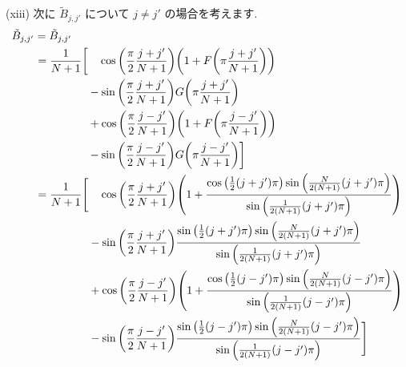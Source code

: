 \documentclass[a4paper,dvipdfmx]{jsarticle}
\theoremstyle{definition}
\begin{document}
(xiii) 次に $\tilde{B}_{j,j'}$ について $j \neq j'$ の場合を考えます.
\begin{align}
  \tilde{B}_{j,j'} & = \tilde{B}_{j,j'}                                                                                                                                                                         \\
                   & \ \begin{aligned}
                         = \frac{1}{N+1}\bigg[ & \quad\cos\qty(\frac{\pi}{2}\frac{j + j'}{N+1})\qty(1 + F\qty(\pi\frac{j + j'}{N+1})) \\
                                               & - \sin\qty(\frac{\pi}{2}\frac{j + j'}{N+1})G\qty(\pi\frac{j + j'}{N+1})              \\
                                               & + \cos\qty(\frac{\pi}{2}\frac{j - j'}{N+1})\qty(1 + F\qty(\pi\frac{j - j'}{N+1}))    \\
                                               & - \sin\qty(\frac{\pi}{2}\frac{j - j'}{N+1})G\qty(\pi\frac{j - j'}{N+1})\bigg]
                       \end{aligned}                                                                                               \\
                   & \ \begin{aligned}
                         = \frac{1}{N+1}\Bigg[ & \quad\cos\qty(\frac{\pi}{2}\frac{j + j'}{N+1})\qty(1 + \frac{\cos\qty(\frac{1}{2}(j+j')\pi)\sin\qty(\frac{N}{2(N+1)}(j+j')\pi)}{\sin\qty(\frac{1}{2(N+1)}(j+j')\pi)}) \\
                                               & - \sin\qty(\frac{\pi}{2}\frac{j + j'}{N+1})\frac{\sin\qty(\frac{1}{2}(j+j')\pi)\sin\qty(\frac{N}{2(N+1)}(j+j')\pi)}{\sin\qty(\frac{1}{2(N+1)}(j+j')\pi)}              \\
                                               & + \cos\qty(\frac{\pi}{2}\frac{j - j'}{N+1})\qty(1 + \frac{\cos\qty(\frac{1}{2}(j-j')\pi)\sin\qty(\frac{N}{2(N+1)}(j-j')\pi)}{\sin\qty(\frac{1}{2(N+1)}(j-j')\pi)})    \\
                                               & - \sin\qty(\frac{\pi}{2}\frac{j - j'}{N+1})\frac{\sin\qty(\frac{1}{2}(j-j')\pi)\sin\qty(\frac{N}{2(N+1)}(j-j')\pi)}{\sin\qty(\frac{1}{2(N+1)}(j-j')\pi)}\Bigg]
                       \end{aligned}                                                                                                \\

\end{align}
\end{document}
